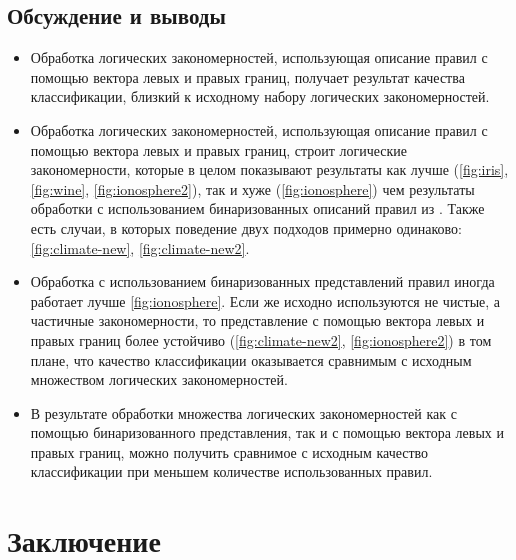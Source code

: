 \documentclass[12pt]{article}
\begin{document}
\subsection{Обсуждение и выводы}


\begin{itemize}
  \item Обработка логических закономерностей, использующая описание
    правил с помощью вектора левых и правых границ, получает результат
    качества классификации, близкий к исходному набору логических
    закономерностей.
  \item Обработка логических закономерностей, использующая описание
    правил с помощью вектора левых и правых границ, строит логические
    закономерности, которые в целом показывают результаты как лучше
    (\ref{fig:iris}, \ref{fig:wine}, \ref{fig:ionosphere2}), так и
    хуже (\ref{fig:ionosphere}) чем результаты обработки с
    использованием бинаризованных описаний правил из
    \cite{novikov15}. Также есть случаи, в которых поведение двух
    подходов примерно одинаково: \ref{fig:climate-new},
    \ref{fig:climate-new2}.
  \item Обработка с использованием бинаризованных представлений правил
    иногда работает лучше \ref{fig:ionosphere}. Если же исходно
    используются не чистые, а частичные закономерности, то
    представление с помощью вектора левых и правых границ более
    устойчиво (\ref{fig:climate-new2}, \ref{fig:ionosphere2}) в том
    плане, что качество классификации оказывается сравнимым с исходным
    множеством логических закономерностей.
  \item В результате обработки множества логических закономерностей
    как с помощью бинаризованного представления, так и с помощью
    вектора левых и правых границ, можно получить сравнимое с исходным
    качество классификации при меньшем количестве использованных
    правил.
\end{itemize}

\section{Заключение}
\end{document}
